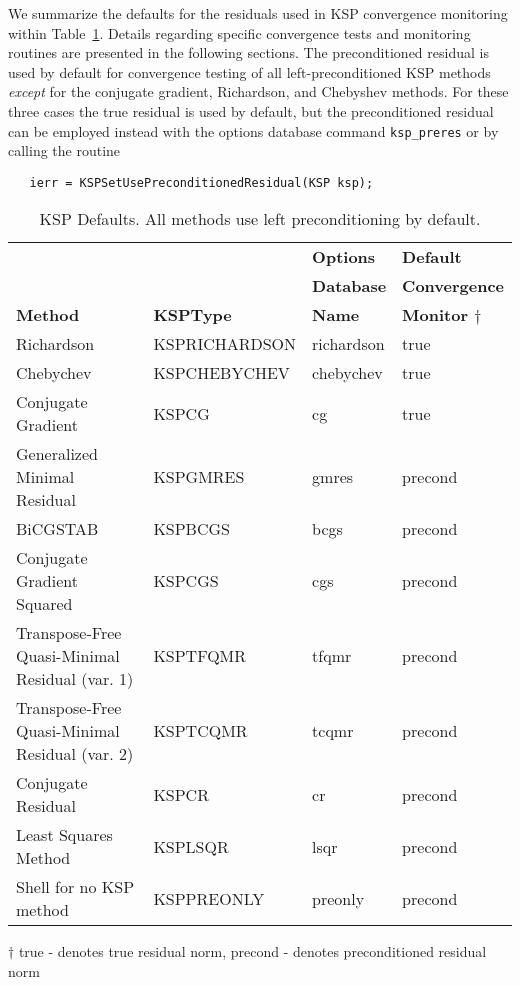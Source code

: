We summarize the defaults for the residuals used in KSP convergence
monitoring within Table~\ref{tab:kspdefaults}.  Details regarding
specific convergence tests and monitoring routines are presented in
the following sections.  The preconditioned residual is used by
default for convergence testing of all left-preconditioned KSP
methods {\em except} for the conjugate gradient, Richardson, and
Chebyshev methods.  For these three cases the true residual is used by
default, but the preconditioned residual can be employed instead with
the options database command {\tt ksp\_preres} or by calling the routine
\begin{verbatim}
   ierr = KSPSetUsePreconditionedResidual(KSP ksp);
\end{verbatim}

\begin{table}
\begin{center}
\begin{tabular}{llll}
& & {\bf Options}	& {\bf Default}\\
& & {\bf Database}	& {\bf Convergence}\\
{\bf Method}	&{\bf KSPType}	& {\bf Name}	& {\bf Monitor $\dagger$}\\
\hline
Richardson			& KSPRICHARDSON	& richardson	& true\\
Chebychev			& KSPCHEBYCHEV	& chebychev	& true\\
Conjugate Gradient \cite{hs:52}		& KSPCG		& cg		& true\\
Generalized Minimal Residual \cite{ss:86}	& KSPGMRES	& gmres		& precond\\
BiCGSTAB \cite{v:92} 			& KSPBCGS	& bcgs		& precond \\
Conjugate Gradient Squared \cite{so:89}	& KSPCGS	& cgs		& precond \\
Transpose-Free Quasi-Minimal Residual (var. 1) \cite{f:93}	& KSPTFQMR	& tfqmr	& precond \\
Transpose-Free Quasi-Minimal Residual (var. 2)	& KSPTCQMR	& tcqmr		& precond \\
Conjugate Residual		& KSPCR		& cr		& precond \\
Least Squares Method		& KSPLSQR	& lsqr		& precond \\
Shell for no KSP method		& KSPPREONLY	& preonly	& precond \\
\hline
\end{tabular}
\medskip \medskip
$\dagger$ true - denotes true residual norm, precond - denotes preconditioned residual norm
\end{center}
\caption{KSP Defaults.  All methods use left preconditioning by default.}
\label{tab:kspdefaults}
\end{table}


